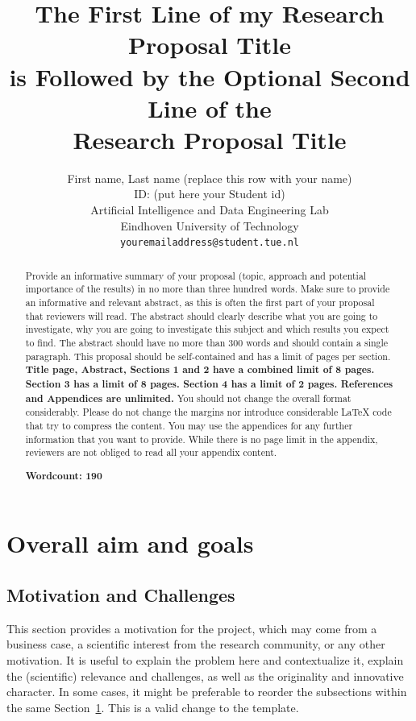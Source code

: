 \documentclass{article}
\title{The First Line of my Research Proposal Title\\is Followed by the Optional Second Line of the\\Research Proposal Title}
\author{
 First name, Last name (replace this row with your name) \\
 ID: (put here your Student id)\\
 Artificial Intelligence and Data Engineering Lab\\
Eindhoven University of Technology\\
  \texttt{youremailaddress@student.tue.nl} \\
}
\begin{document}
\maketitle
\begin{abstract}
  Provide an informative summary of your proposal (topic, approach and potential importance of the results) in no more than three hundred words.
  Make sure to provide an informative and relevant abstract, as this is often the first part of your proposal that reviewers will read. The abstract should clearly describe what you are going to investigate, why you are going to investigate this subject and which results you expect to find.
  The abstract should have no more than 300 words and should contain a single paragraph.
  This proposal should be self-contained and has a limit of pages per section. \textbf{Title page, Abstract, Sections 1 and 2 have a combined limit of 8 pages. Section 3 has a limit of 8 pages. Section 4 has a limit of 2 pages. References and Appendices are unlimited.} You should not change the overall format considerably. Please do not change the margins nor introduce considerable LaTeX code that try to compress the content. You may use the appendices for any further information that you want to provide. While there is no page limit in the appendix, reviewers are not obliged to read all your appendix content.

  \noindent\textbf{Wordcount: 190}
\end{abstract}

\section{Overall aim and goals}
\label{sec:goals}
\subsection{Motivation and Challenges}

This section provides a motivation for the project, which may come from a business case, a scientific interest from the research community, or any other motivation. It is useful to explain the problem here and contextualize it, explain the (scientific) relevance and challenges, as well as the originality and innovative character. In some cases, it might be preferable to reorder the subsections within the same Section~\ref{sec:goals}. This is a valid change to the template.
\end{document}
